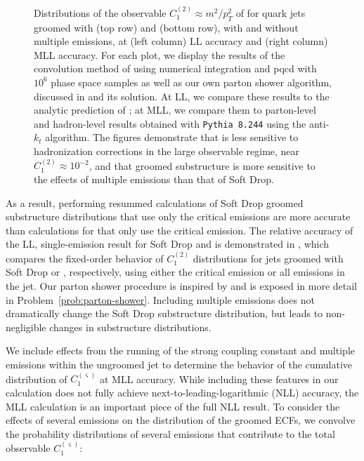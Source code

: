 \begin{figure}[t!]
{\label{fig:MLL_PRSF1}
}
\caption[Distributions of the observable \(C_1^{(2)}\approx m^2 / p_T^2\) for quark jets groomed with  and .]{
Distributions of the observable \(C_1^{(2)}\approx m^2 / p_T^2\) of  for quark jets groomed with  (top row) and  (bottom row), with and without multiple emissions, at (left column) LL accuracy and (right column) MLL accuracy.
%
For each plot, we display the results of the convolution method of  using numerical integration and \gls{pqcd} with \(10^6\) phase space samples as well as our own parton shower algorithm, discussed in  and its solution.
%
At LL, we compare these results to the analytic prediction of ;
%
at MLL, we compare them to parton-level and hadron-level results obtained with \texttt{Pythia 8.244} using the anti-\(k_t\) algorithm.
%
The figures demonstrate that  is less sensitive to \gls{hadronization} corrections in the large observable regime, near \(C_1^{(2)} \approx 10^{-2}\), and that  groomed substructure is more sensitive to the effects of multiple emissions than that of Soft Drop.
}
\label{fig:Calculations}
\end{figure}

As a result, performing resummed calculations of Soft Drop groomed substructure distributions that use only the critical emissions are more accurate than calculations for  that only use the critical emission.
%
The relative accuracy of the LL, single-emission result for Soft Drop and  is demonstrated in , which compares the fixed-order behavior of \(C_1^{(2)}\) distributions for jets groomed with Soft Drop or , respectively, using either the critical emission or all emissions in the jet.
%
Our parton shower procedure is inspired by  and is exposed in more detail in Problem~\ref{prob:parton-shower}.
%
Including multiple emissions does not dramatically change the Soft Drop substructure distribution, but leads to non-negligible changes in  substructure distributions.


We include effects from the running of the strong coupling constant and multiple emissions within the ungroomed jet to determine the behavior of the cumulative distribution of \(C_1^{(\varsigma)}\) at MLL accuracy.
%
While including these features in our calculation does not fully achieve next-to-leading-logarithmic (NLL) accuracy, the MLL calculation is an important piece of the full NLL result.
%
To consider the effects of several emissions on the distribution of the groomed ECFs, we convolve the probability distributions of several emissions that contribute to the total observable \(C_1^{(\varsigma)}\):

